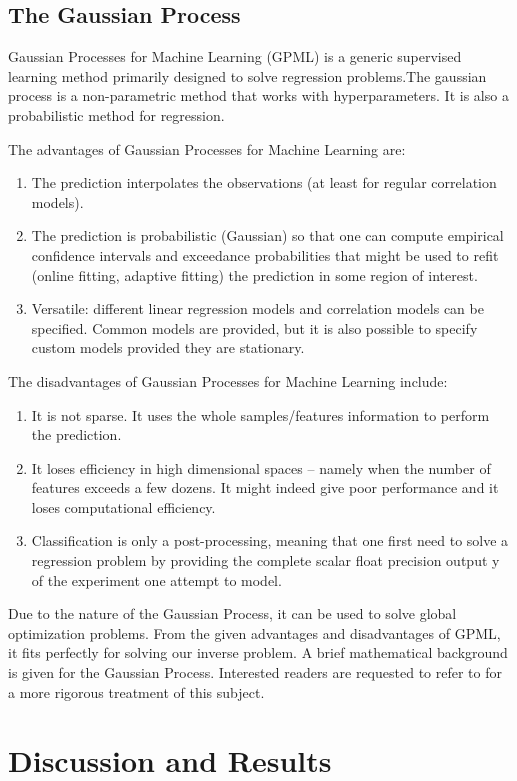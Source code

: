 \subsection{The Gaussian Process}
Gaussian Processes for Machine Learning (GPML) is a generic supervised learning method primarily designed to solve regression problems.The gaussian process is a non-parametric method that works with hyperparameters. It is also a probabilistic method for regression.

The advantages of Gaussian Processes for Machine Learning are:
\begin{enumerate}
        \item The prediction interpolates the observations (at least for regular correlation models).
        \item The prediction is probabilistic (Gaussian) so that one can compute empirical confidence intervals and exceedance probabilities that might be used to refit (online fitting, adaptive fitting) the prediction in some region of interest.
        \item Versatile: different linear regression models and correlation models can be specified. Common models are provided, but it is also possible to specify custom models provided they are stationary.
\end{enumerate}
The disadvantages of Gaussian Processes for Machine Learning include:
\begin{enumerate}


        \item It is not sparse. It uses the whole samples/features information to perform the prediction.
        \item It loses efficiency in high dimensional spaces – namely when the number of features exceeds a few dozens. It might indeed give poor performance and it loses computational efficiency.
        \item Classification is only a post-processing, meaning that one first need to solve a regression problem by providing the complete scalar float precision output y of the experiment one attempt to model.

\end{enumerate}

Due to the nature of the Gaussian Process, it can be used to solve global optimization problems. From the given advantages and disadvantages of GPML, it fits perfectly for solving our inverse problem. A brief mathematical background is given for the Gaussian Process. Interested readers are requested to refer to \cite{gp} \cite{gp_tut} for a more rigorous treatment of this subject.
 
\section{Discussion and Results}